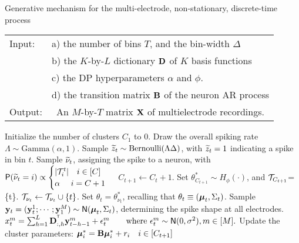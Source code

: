 \begin{algorithm}
\caption{Generative mechanism for the multi-electrode, non-stationary, discrete-time process}\label{alg:gen_proc}
\begin{tabular}{p{1.2cm}p{12.4cm}}
Input:&  a) the number of bins $T$, and the bin-width $\Delta$\\
  &  b) the $K$-by-$L$ dictionary $\mathbf{D}$ of $K$ basis functions\\
  &  c) the DP hyperparameters $\alpha$ and $\phi$.\\ 
  &  d) the transition matrix $\mathbf{B}$ of the neuron AR process \\
Output:& \  An $M$-by-$T$ matrix $\mathbf{X}$ of multielectrode recordings. %
\end{tabular}
\begin{algorithmic}[1]
\State Initialize the number of clusters $C_1$ to $0$.
\State Draw the overall spiking rate $\Lambda \sim \text{Gamma}(\alpha, 1)$.
\State Sample $\widetilde{z}_t \sim \text{Bernoulli}(\Lambda \Delta)$, with $\widetilde{z}_t = 1$ indicating a spike in bin $t$.
   \label{enum:thin}
  \State Sample $\widetilde{\nu}_t$, assigning the spike to a neuron, with
$  \mathsf{P}({\widetilde{\nu}_t} = i) \propto 
  \begin{cases}
   |\mathcal{T}^t_i| \quad i \in [C] \\
   \alpha \quad\ i = C + 1 \\
  \end{cases}$
          \State  $C_{t+1} \leftarrow C_t + 1$. 
		\State Set $\theta^*_{C_{t+1}} \sim H_{\phi}(\cdot)$, and $\mathcal{T}_{C_{t+1}}$=\{t\}.
       \Else \State  $\mathcal{T}_{\nu_t} \leftarrow \mathcal{T}_{\nu_t} \cup \{t\}$.
    \EndIf
\State Set $\theta_t = \theta^*_{\nu_t}$, recalling that $\theta_t \equiv (\boldsymbol{\mu}_t, \Sigma_t)$.
\State Sample $\by_t = (\by^1_t; \cdots; \by^M_1) %
           \sim \mathsf{N}(\mb{\mu}_t, \Sigma_t)$, determining the spike shape at all electrodes.
\State $ x^m_t = \sum_{h = 1}^L \mathbf{D}_{:,h}^{^{\mathsf{T}}} \mathbf{y}^m_{t-h-1} + \epsilon^m_t \text{\qquad where $\epsilon^m_t \sim \mathsf{N}(0,\sigma^2), m \in [M]$.} $
\State Update the cluster parameters: ${\boldsymbol{\mu}}^*_i = \mathbf{B} {\boldsymbol{\mu}}^*_i + r_i \quad i \in [C_{t+1}]$
\EndIf
\EndFor
\end{algorithmic}
\end{algorithm}

